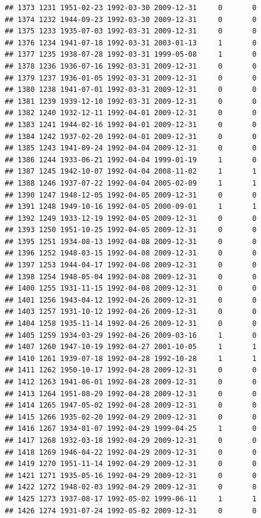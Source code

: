\documentclass[
]{book}
\begin{document}
\begin{verbatim}
## 1373 1231 1951-02-23 1992-03-30 2009-12-31     0       0
## 1374 1232 1944-09-23 1992-03-30 2009-12-31     0       0
## 1375 1233 1935-07-03 1992-03-31 2009-12-31     0       0
## 1376 1234 1941-07-18 1992-03-31 2003-01-13     1       0
## 1377 1235 1938-07-28 1992-03-31 1999-05-08     1       0
## 1378 1236 1936-07-16 1992-03-31 2009-12-31     0       0
## 1379 1237 1936-01-05 1992-03-31 2009-12-31     0       0
## 1380 1238 1941-07-01 1992-03-31 2009-12-31     0       0
## 1381 1239 1939-12-10 1992-03-31 2009-12-31     0       0
## 1382 1240 1932-12-11 1992-04-01 2009-12-31     0       0
## 1383 1241 1944-02-16 1992-04-01 2009-12-31     0       0
## 1384 1242 1937-02-20 1992-04-01 2009-12-31     0       0
## 1385 1243 1941-09-24 1992-04-04 2009-12-31     0       0
## 1386 1244 1933-06-21 1992-04-04 1999-01-19     1       0
## 1387 1245 1942-10-07 1992-04-04 2008-11-02     1       1
## 1388 1246 1937-07-22 1992-04-04 2005-02-09     1       1
## 1390 1247 1948-12-05 1992-04-05 2009-12-31     0       0
## 1391 1248 1949-10-16 1992-04-05 2000-09-01     1       1
## 1392 1249 1933-12-19 1992-04-05 2009-12-31     0       0
## 1393 1250 1951-10-25 1992-04-05 2009-12-31     0       0
## 1395 1251 1934-08-13 1992-04-08 2009-12-31     0       0
## 1396 1252 1948-03-15 1992-04-08 2009-12-31     0       0
## 1397 1253 1944-04-17 1992-04-08 2009-12-31     0       0
## 1398 1254 1948-05-04 1992-04-08 2009-12-31     0       0
## 1400 1255 1931-11-15 1992-04-08 2009-12-31     0       0
## 1401 1256 1943-04-12 1992-04-26 2009-12-31     0       0
## 1403 1257 1931-10-12 1992-04-26 2009-12-31     0       0
## 1404 1258 1935-11-14 1992-04-26 2009-12-31     0       0
## 1405 1259 1934-03-29 1992-04-26 2009-03-16     1       0
## 1407 1260 1947-10-19 1992-04-27 2001-10-05     1       1
## 1410 1261 1939-07-18 1992-04-28 1992-10-28     1       1
## 1411 1262 1950-10-17 1992-04-28 2009-12-31     0       0
## 1412 1263 1941-06-01 1992-04-28 2009-12-31     0       0
## 1413 1264 1951-08-29 1992-04-28 2009-12-31     0       0
## 1414 1265 1947-05-02 1992-04-28 2009-12-31     0       0
## 1415 1266 1935-02-20 1992-04-29 2009-12-31     0       0
## 1416 1267 1934-01-07 1992-04-29 1999-04-25     1       0
## 1417 1268 1932-03-18 1992-04-29 2009-12-31     0       0
## 1418 1269 1946-04-22 1992-04-29 2009-12-31     0       0
## 1419 1270 1951-11-14 1992-04-29 2009-12-31     0       0
## 1421 1271 1935-05-16 1992-04-29 2009-12-31     0       0
## 1422 1272 1948-02-03 1992-04-29 2009-12-31     0       0
## 1425 1273 1937-08-17 1992-05-02 1999-06-11     1       1
## 1426 1274 1931-07-24 1992-05-02 2009-12-31     0       0

\end{verbatim}
\end{document}
